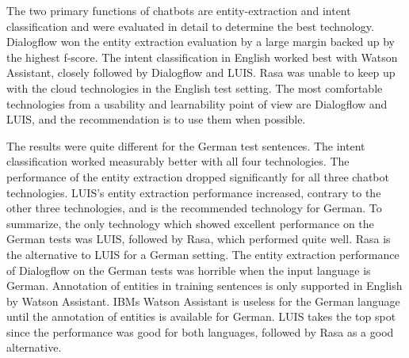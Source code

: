 The two primary functions of chatbots are entity-extraction and intent classification and were evaluated in detail to determine the best technology.
Dialogflow won the entity extraction evaluation by a large margin backed up by the highest f-score.
The intent classification in English worked best with Watson Assistant, closely followed by Dialogflow and LUIS.
Rasa was unable to keep up with the cloud technologies in the English test setting.
The most comfortable technologies from a usability and learnability point of view are Dialogflow and LUIS, and the recommendation is to use them when possible.

The results were quite different for the German test sentences.
The intent classification worked measurably better with all four technologies.
The performance of the entity extraction dropped significantly for all three chatbot technologies.
LUIS's entity extraction performance increased, contrary to the other three technologies, and is the recommended technology for German.
To summarize, the only technology which showed excellent performance on the German tests was LUIS, followed by Rasa, which performed quite well.
Rasa is the alternative to LUIS for a German setting.
The entity extraction performance of Dialogflow on the German tests was horrible when the input language is German.
Annotation of entities in training sentences is only supported in English by Watson Assistant.
IBMs Watson Assistant is useless for the German language until the annotation of entities is available for German.
LUIS takes the top spot since the performance was good for both languages, followed by Rasa as a good alternative.